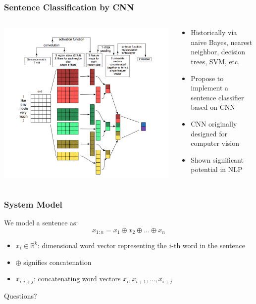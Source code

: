 \documentclass{beamer}
\begin{document}
\begin{frame}
\frametitle{Sentence Classification by CNN}
        \begin{columns}
    \begin{column}{0.5\textwidth}
    \center\includegraphics[width=\textwidth]{figure/sc_cnn}
    \end{column}
    \begin{column}{0.5\textwidth}
    \begin{itemize}
        \item Historically via naive Bayes, nearest neighbor, decision trees, SVM, etc.
        \item Propose to implement a sentence classifier based on CNN
        \item CNN originally designed for computer vision
        \item Shown significant potential in NLP
    \end{itemize}
    \end{column}
    \end{columns}
\end{frame}

\begin{frame}
\frametitle{System Model}
    We model a sentence as:
    $$x_{1:n} = x_1 \oplus x_2 \oplus ... \oplus x_n$$
    \begin{itemize}
        \item $x_{i} \in \mathbb{R}^k$: dimensional word vector representing the $i$-th word in the sentence
        \item $\oplus$ signifies concatenation
        \item $x_{i:i+j}$: concatenating word vectors $x_i, x_{i+1}, ... , x_{i+j}$
    \end{itemize}
\end{frame}

\begin{frame}
\center Questions?
\end{frame}
\end{document}
